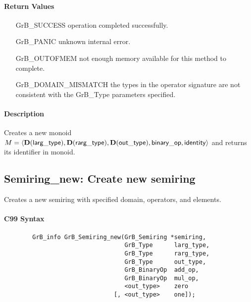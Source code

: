 \paragraph{Return Values}

\begin{itemize}[leftmargin=2.1in]
\item[{\sf GrB\_SUCCESS}]           operation completed successfully.
\item[{\sf GrB\_PANIC}]             unknown internal error.
\item[{\sf GrB\_OUTOFMEM}]          not enough memory available for this method to complete.
\item[{\sf GrB\_DOMAIN\_MISMATCH}]  the types in the operator signature are not   
                                    consistent with the {\sf GrB\_Type} parameters specified.
\end{itemize}

\paragraph{Description}

Creates a new monoid $M = \langle \bold{D}({\sf larg\_type}), \bold{D}({\sf rarg\_type}), 
\bold{D}({\sf out\_type}), {\sf binary\_op}, {\sf identity} \rangle$ and
returns its identifier in {\sf monoid}.


\subsection{{\sf Semiring\_new}: Create new semiring}

Creates a new semiring with specified domain, operators, and elements.

\paragraph{C99 Syntax}

\begin{verbatim}
        GrB_info GrB_Semiring_new(GrB_Semiring *semiring,
                                  GrB_Type      larg_type,
                                  GrB_Type      rarg_type,
                                  GrB_Type      out_type,
                                  GrB_BinaryOp  add_op,
                                  GrB_BinaryOp  mul_op,
                                  <out_type>    zero
                               [, <out_type>    one]);
\end{verbatim}

